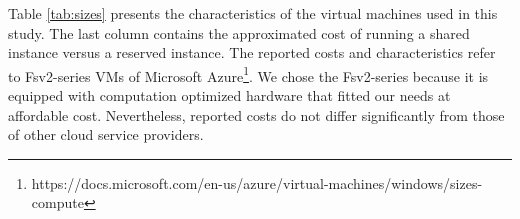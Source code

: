 {Table \ref{tab:sizes} presents the characteristics of the virtual machines used in this study. The last column contains the approximated cost of running a shared instance versus a reserved instance. 
The reported costs and characteristics refer to Fsv2-series VMs of Microsoft Azure\footnote{https://docs.microsoft.com/en-us/azure/virtual-machines/windows/sizes-compute}. We chose the Fsv2-series because it is equipped with computation optimized hardware that fitted our needs at affordable cost.
Nevertheless, reported costs do not differ significantly from those of other cloud service providers. 

%
%
%


}
